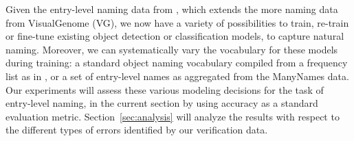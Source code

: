 
Given the entry-level naming data from \mn, which extends the more \arbitrary naming data from VisualGenome (VG), we now have a variety of possibilities to train, re-train or fine-tune existing object detection or classification models, to capture natural naming.
Moreover, we can systematically vary the vocabulary for these models during training: a standard object naming vocabulary compiled from a frequency list as in \cite{anderson2018updown}, or a set of entry-level names as aggregated from the ManyNames data.
Our experiments will assess these various modeling decisions for the task of entry-level naming, in the current section by using accuracy as a standard evaluation metric.
Section~\ref{sec:analysis} will analyze the results with respect to the different types of errors identified by our verification data.

